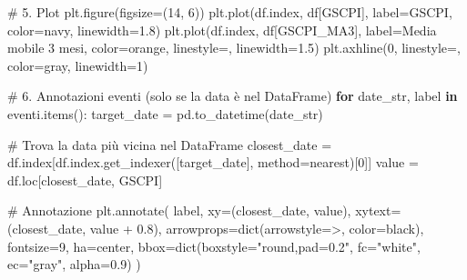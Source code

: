 \documentclass[
  11pt,
  letterpaper,
  DIV=11,
  numbers=noendperiod]{scrartcl}
\newenvironment{Shaded}{\begin{snugshade}}{\end{snugshade}}
\newcommand{\BuiltInTok}[1]{\textcolor[rgb]{0.00,0.23,0.31}{#1}}
\newcommand{\CommentTok}[1]{\textcolor[rgb]{0.37,0.37,0.37}{#1}}
\newcommand{\ControlFlowTok}[1]{\textcolor[rgb]{0.00,0.23,0.31}{\textbf{#1}}}
\newcommand{\DecValTok}[1]{\textcolor[rgb]{0.68,0.00,0.00}{#1}}
\newcommand{\FloatTok}[1]{\textcolor[rgb]{0.68,0.00,0.00}{#1}}
\newcommand{\KeywordTok}[1]{\textcolor[rgb]{0.00,0.23,0.31}{\textbf{#1}}}
\newcommand{\NormalTok}[1]{\textcolor[rgb]{0.00,0.23,0.31}{#1}}
\newcommand{\OperatorTok}[1]{\textcolor[rgb]{0.37,0.37,0.37}{#1}}
\newcommand{\StringTok}[1]{\textcolor[rgb]{0.13,0.47,0.30}{#1}}
\begin{document}
\begin{Shaded}
\begin{Highlighting}[]
\CommentTok{\# 5. Plot}
\NormalTok{plt.figure(figsize}\OperatorTok{=}\NormalTok{(}\DecValTok{14}\NormalTok{, }\DecValTok{6}\NormalTok{))}
\NormalTok{plt.plot(df.index, df[}\StringTok{\textquotesingle{}GSCPI\textquotesingle{}}\NormalTok{], label}\OperatorTok{=}\StringTok{\textquotesingle{}GSCPI\textquotesingle{}}\NormalTok{, color}\OperatorTok{=}\StringTok{\textquotesingle{}navy\textquotesingle{}}\NormalTok{, linewidth}\OperatorTok{=}\FloatTok{1.8}\NormalTok{)}
\NormalTok{plt.plot(df.index, df[}\StringTok{\textquotesingle{}GSCPI\_MA3\textquotesingle{}}\NormalTok{], label}\OperatorTok{=}\StringTok{\textquotesingle{}Media mobile 3 mesi\textquotesingle{}}\NormalTok{, color}\OperatorTok{=}\StringTok{\textquotesingle{}orange\textquotesingle{}}\NormalTok{, linestyle}\OperatorTok{=}\StringTok{\textquotesingle{}{-}{-}\textquotesingle{}}\NormalTok{, linewidth}\OperatorTok{=}\FloatTok{1.5}\NormalTok{)}
\NormalTok{plt.axhline(}\DecValTok{0}\NormalTok{, linestyle}\OperatorTok{=}\StringTok{\textquotesingle{}{-}{-}\textquotesingle{}}\NormalTok{, color}\OperatorTok{=}\StringTok{\textquotesingle{}gray\textquotesingle{}}\NormalTok{, linewidth}\OperatorTok{=}\DecValTok{1}\NormalTok{)}

\CommentTok{\# 6. Annotazioni eventi (solo se la data è nel DataFrame)}
\ControlFlowTok{for}\NormalTok{ date\_str, label }\KeywordTok{in}\NormalTok{ eventi.items():}
\NormalTok{    target\_date }\OperatorTok{=}\NormalTok{ pd.to\_datetime(date\_str)}

    \CommentTok{\# Trova la data più vicina nel DataFrame}
\NormalTok{    closest\_date }\OperatorTok{=}\NormalTok{ df.index[df.index.get\_indexer([target\_date], method}\OperatorTok{=}\StringTok{\textquotesingle{}nearest\textquotesingle{}}\NormalTok{)[}\DecValTok{0}\NormalTok{]]}
\NormalTok{    value }\OperatorTok{=}\NormalTok{ df.loc[closest\_date, }\StringTok{\textquotesingle{}GSCPI\textquotesingle{}}\NormalTok{]}

    \CommentTok{\# Annotazione}
\NormalTok{    plt.annotate(}
\NormalTok{        label,}
\NormalTok{        xy}\OperatorTok{=}\NormalTok{(closest\_date, value),}
\NormalTok{        xytext}\OperatorTok{=}\NormalTok{(closest\_date, value }\OperatorTok{+} \FloatTok{0.8}\NormalTok{),}
\NormalTok{        arrowprops}\OperatorTok{=}\BuiltInTok{dict}\NormalTok{(arrowstyle}\OperatorTok{=}\StringTok{\textquotesingle{}{-}\textgreater{}\textquotesingle{}}\NormalTok{, color}\OperatorTok{=}\StringTok{\textquotesingle{}black\textquotesingle{}}\NormalTok{),}
\NormalTok{        fontsize}\OperatorTok{=}\DecValTok{9}\NormalTok{,}
\NormalTok{        ha}\OperatorTok{=}\StringTok{\textquotesingle{}center\textquotesingle{}}\NormalTok{,}
\NormalTok{        bbox}\OperatorTok{=}\BuiltInTok{dict}\NormalTok{(boxstyle}\OperatorTok{=}\StringTok{"round,pad=0.2"}\NormalTok{, fc}\OperatorTok{=}\StringTok{"white"}\NormalTok{, ec}\OperatorTok{=}\StringTok{"gray"}\NormalTok{, alpha}\OperatorTok{=}\FloatTok{0.9}\NormalTok{)}
\NormalTok{    )}


\end{Highlighting}
\end{Shaded}
\end{document}

